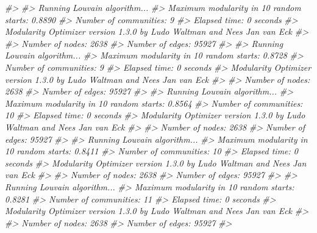 \documentclass[
]{book}
\newenvironment{Shaded}{\begin{snugshade}}{\end{snugshade}}
\newcommand{\CommentTok}[1]{\textcolor[rgb]{0.56,0.35,0.01}{\textit{#1}}}
\begin{document}
\begin{Shaded}
\begin{Highlighting}[]
\CommentTok{\#\textgreater{} }
\CommentTok{\#\textgreater{} Running Louvain algorithm...}
\CommentTok{\#\textgreater{} Maximum modularity in 10 random starts: 0.8890}
\CommentTok{\#\textgreater{} Number of communities: 9}
\CommentTok{\#\textgreater{} Elapsed time: 0 seconds}
\CommentTok{\#\textgreater{} Modularity Optimizer version 1.3.0 by Ludo Waltman and Nees Jan van Eck}
\CommentTok{\#\textgreater{} }
\CommentTok{\#\textgreater{} Number of nodes: 2638}
\CommentTok{\#\textgreater{} Number of edges: 95927}
\CommentTok{\#\textgreater{} }
\CommentTok{\#\textgreater{} Running Louvain algorithm...}
\CommentTok{\#\textgreater{} Maximum modularity in 10 random starts: 0.8728}
\CommentTok{\#\textgreater{} Number of communities: 9}
\CommentTok{\#\textgreater{} Elapsed time: 0 seconds}
\CommentTok{\#\textgreater{} Modularity Optimizer version 1.3.0 by Ludo Waltman and Nees Jan van Eck}
\CommentTok{\#\textgreater{} }
\CommentTok{\#\textgreater{} Number of nodes: 2638}
\CommentTok{\#\textgreater{} Number of edges: 95927}
\CommentTok{\#\textgreater{} }
\CommentTok{\#\textgreater{} Running Louvain algorithm...}
\CommentTok{\#\textgreater{} Maximum modularity in 10 random starts: 0.8564}
\CommentTok{\#\textgreater{} Number of communities: 10}
\CommentTok{\#\textgreater{} Elapsed time: 0 seconds}
\CommentTok{\#\textgreater{} Modularity Optimizer version 1.3.0 by Ludo Waltman and Nees Jan van Eck}
\CommentTok{\#\textgreater{} }
\CommentTok{\#\textgreater{} Number of nodes: 2638}
\CommentTok{\#\textgreater{} Number of edges: 95927}
\CommentTok{\#\textgreater{} }
\CommentTok{\#\textgreater{} Running Louvain algorithm...}
\CommentTok{\#\textgreater{} Maximum modularity in 10 random starts: 0.8411}
\CommentTok{\#\textgreater{} Number of communities: 10}
\CommentTok{\#\textgreater{} Elapsed time: 0 seconds}
\CommentTok{\#\textgreater{} Modularity Optimizer version 1.3.0 by Ludo Waltman and Nees Jan van Eck}
\CommentTok{\#\textgreater{} }
\CommentTok{\#\textgreater{} Number of nodes: 2638}
\CommentTok{\#\textgreater{} Number of edges: 95927}
\CommentTok{\#\textgreater{} }
\CommentTok{\#\textgreater{} Running Louvain algorithm...}
\CommentTok{\#\textgreater{} Maximum modularity in 10 random starts: 0.8281}
\CommentTok{\#\textgreater{} Number of communities: 11}
\CommentTok{\#\textgreater{} Elapsed time: 0 seconds}
\CommentTok{\#\textgreater{} Modularity Optimizer version 1.3.0 by Ludo Waltman and Nees Jan van Eck}
\CommentTok{\#\textgreater{} }
\CommentTok{\#\textgreater{} Number of nodes: 2638}
\CommentTok{\#\textgreater{} Number of edges: 95927}
\CommentTok{\#\textgreater{} }

\end{Highlighting}
\end{Shaded}
\end{document}
